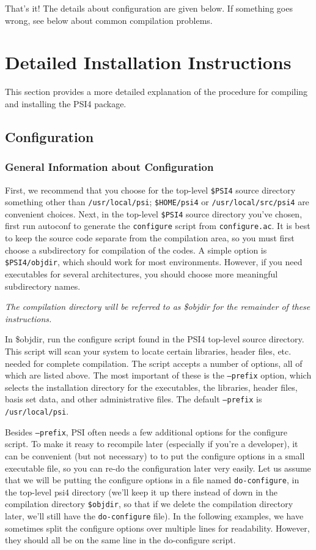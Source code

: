 \documentclass[12pt]{article}
\begin{document}
That's it!  The details about configuration are given below.  If something
goes wrong, see below about common compilation problems.

\section{Detailed Installation Instructions}

This section provides a more detailed explanation of the procedure for
compiling and installing the PSI4 package.

\subsection{Configuration}

\subsubsection{General Information about Configuration}

First, we recommend that you choose for the top-level {\tt \$PSI4} source
directory something other than {\tt /usr/local/psi}; {\tt \$HOME/psi4}
or {\tt /usr/local/src/psi4} are convenient choices.  Next, in the
top-level {\tt \$PSI4} source directory you've chosen, first run autoconf
to generate the {\tt configure} script from {\tt configure.ac}.  It is
best to keep the source code separate from the compilation area, so you
must first choose a subdirectory for compilation of the codes.  A simple
option is {\tt \$PSI4/objdir}, which should work for most environments.
However, if you need executables for several architectures, you should
choose more meaningful subdirectory names.

{\em The compilation directory will be referred to as \$objdir for the
   remainder of these instructions.
}

In \$objdir, run the configure script found in the PSI4 top-level
source directory.  This script will scan your system to locate
certain libraries, header files, etc. needed for complete compilation.
The script accepts a number of options, all of which are listed above.
The most important of these is the {\tt --prefix} option, which selects
the installation directory for the executables, the libraries, header
files, basis set data, and other administrative files.  The default
{\tt --prefix} is {\tt /usr/local/psi}.

Besides {\tt --prefix}, PSI often needs a few additional options for
the configure script.  To make it reasy to recompile later (especially
if you're a developer), it can be convenient (but not necessary) to
to put the configure options in a small executable file, so you can
re-do the configuration later very easily. Let us assume that we will
be putting the configure options in a file named {\tt do-configure},
in the top-level psi4 directory (we'll keep it up there instead of down
in the compilation directory {\tt \$objdir}, so that if we delete the
compilation directory later, we'll still have the {\tt do-configure}
file). In the following examples, we have sometimes split the configure
options over multiple lines for readability. However, they should all
be on the same line in the do-configure script.
\end{document}
